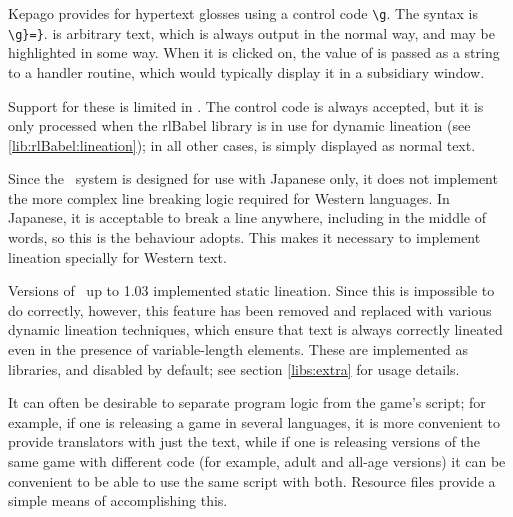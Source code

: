 
    Kepago provides for hypertext glosses using a control code \lstinline|\g|.
    The syntax is
    \lstinline|\g|\rawlbrace{}\lstinline|}=|\rawlbrace{}\lstinline|}|.
     is arbitrary text, which is always output in the normal way,
    and may be highlighted in some way.  When it is clicked on, the value of
     is passed as a string to a handler routine, which would
    typically display it in a subsidiary window.

    Support for these is limited in \compiler.  The control code is always
    accepted, but it is only processed when the rlBabel library is in use for
    dynamic lineation (see \ref{lib:rlBabel:lineation}); in all other cases,
     is simply displayed as normal text.

  \label{sec:lineation}

    Since the \reallive\ system is designed for use with Japanese only, it does
    not implement the more complex line breaking logic required for Western
    languages.  In Japanese, it is acceptable to break a line anywhere,
    including in the middle of words, so this is the behaviour \reallive{}
    adopts.  This makes it necessary to implement lineation specially for
    Western text.

    Versions of \package\ up to 1.03 implemented static lineation.  Since this 
    is impossible to do correctly, however, this feature has been removed and 
    replaced with various dynamic lineation techniques, which ensure that text 
    is always correctly lineated even in the presence of variable-length 
    elements.  These are implemented as libraries, and disabled by default; see 
    section \ref{libs:extra} for usage details.

\label{sec:resources}

  It can often be desirable to separate program logic from the game's script;
  for example, if one is releasing a game in several languages, it is more
  convenient to provide translators with just the text, while if one is
  releasing versions of the same game with different code (for example, adult
  and all-age versions) it can be convenient to be able to use the same script
  with both.  Resource files provide a simple means of accomplishing this.

